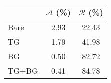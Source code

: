 \begin{tabular}{lSS}
\toprule
 & {$\mathscr{A}$ (\unit{\percent})} & {$\mathscr{R}$ (\unit{\percent})} \\
\midrule
Bare & 2.93 & 22.43 \\
TG & 1.79 & 41.98 \\
BG & 0.50 & 82.72 \\
TG+BG & 0.41 & 84.78 \\
\bottomrule
\end{tabular}
